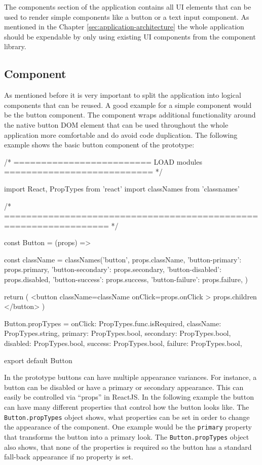 The components section of the application contains all UI elements that can be used to render simple components like a button or a text input component. As mentioned in the Chapter \ref{sec:application-architecture} the whole application should be expendable by only using existing UI components from the component library.

\subsection{Component}

As mentioned before it is very important to split the application into logical components that can be reused. A good example for a simple component would be the button component. The component wraps additional functionality around the native button DOM element that can be used throughout the whole application more comfortable and do avoid code duplication. The following example shows the basic button component of the prototype:\newline

\begin{JsCode}
/* ========================= LOAD modules =========================== */

import React, { PropTypes } from 'react'
import classNames from 'classnames'

/* ================================================================= */

const Button = (props) => {

  const className = classNames('button', props.className, {
    'button-primary': props.primary,
    'button-secondary': props.secondary,
    'button-disabled': props.disabled,
    'button-success': props.success,
    'button-failure': props.failure,
  })

  return (
    <button
      className={className}
      onClick={props.onClick}
    >
      {props.children}
    </button>
  )
}

Button.propTypes = {
  onClick: PropTypes.func.isRequired,
  className: PropTypes.string,
  primary: PropTypes.bool,
  secondary: PropTypes.bool,
  disabled: PropTypes.bool,
  success: PropTypes.bool,
  failure: PropTypes.bool,
}

export default Button
\end{JsCode}

In the prototype buttons can have multiple appearance variances. For instance, a button can be disabled or have a primary or secondary appearance. This can easily be controlled via \enquote{props} in ReactJS. In the following example the button can have many different properties that control how the button looks like. The \texttt{Button.propTypes} object shows, what properties can be set in order to change the appearance of the component. One example would be the \texttt{primary} property that transforms the button into a primary look. The \texttt{Button.propTypes} object also shows, that none of the properties is required so the button has a standard fall-back appearance if no property is set.

